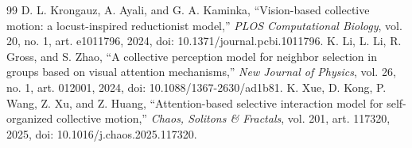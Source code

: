 \documentclass[UTF8,fontset=windows,11pt]{ctexart}
\begin{document}
\begin{thebibliography}{99}
 D. L. Krongauz, A. Ayali, and G. A. Kaminka, ``Vision-based collective motion: a locust-inspired reductionist model,'' \emph{PLOS Computational Biology}, vol. 20, no. 1, art. e1011796, 2024, doi: 10.1371/journal.pcbi.1011796.
 K. Li, L. Li, R. Gross, and S. Zhao, ``A collective perception model for neighbor selection in groups based on visual attention mechanisms,'' \emph{New Journal of Physics}, vol. 26, no. 1, art. 012001, 2024, doi: 10.1088/1367-2630/ad1b81.
 K. Xue, D. Kong, P. Wang, Z. Xu, and Z. Huang, ``Attention-based selective interaction model for self-organized collective motion,'' \emph{Chaos, Solitons \& Fractals}, vol. 201, art. 117320, 2025, doi: 10.1016/j.chaos.2025.117320.
\end{thebibliography}
\end{document}
